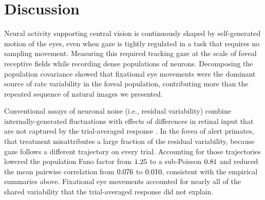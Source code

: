 \documentclass{lite}
\begin{document}

\section{Discussion}

Neural activity supporting central vision is continuously shaped by self-generated motion of the eyes, even when gaze is tightly regulated in a task that requires no sampling movement. Measuring this required tracking gaze at the scale of foveal receptive fields while recording dense populations of neurons. Decomposing the population covariance showed that fixational eye movements were the dominant source of rate variability in the foveal population, contributing more than the repeated sequence of natural images we presented.

Conventional assays of neuronal noise (i.e., residual variability) combine internally-generated fluctuations with effects of differences in retinal input that are not captured by the trial-averaged response \cite{tolhurst1983statistical, shadlen1998variable}. In the fovea of alert primates, that treatment misattributes a large fraction of the residual variability, because gaze follows a different trajectory on every trial. Accounting for those trajectories lowered the population Fano factor from $1.25$ to a sub-Poisson $0.81$ and reduced the mean pairwise correlation from $0.076$ to $0.010$, consistent with the empirical summaries above. Fixational eye movements accounted for nearly all of the shared variability that the trial-averaged response did not explain.
\end{document}

